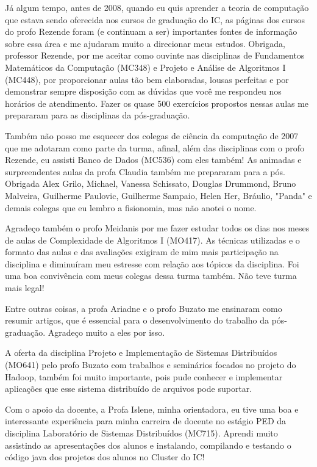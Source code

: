 Já algum tempo, antes de 2008, quando eu quis aprender a teoria de computação que estava sendo oferecida nos cursos de graduação do IC, as páginas dos cursos do profo Rezende foram (e continuam a ser) importantes fontes de informação sobre essa área e me ajudaram muito a direcionar meus estudos. Obrigada, professor Rezende, por me aceitar como ouvinte nas disciplinas de Fundamentos Matemáticos da Computação (MC348) e Projeto e Análise de Algoritmos I (MC448), por proporcionar aulas tão bem elaboradas, lousas perfeitas e por demonstrar sempre disposição com as dúvidas que você me respondeu nos horários de atendimento. Fazer os quase 500 exercícios propostos nessas aulas me prepararam para as disciplinas da pós-graduação.

Também não posso me esquecer dos colegas de ciência da computação de 2007 que me adotaram como parte da turma, afinal, além das disciplinas com o profo Rezende, eu assisti Banco de Dados (MC536) com eles também! As animadas e surpreendentes aulas da profa Claudia também me prepararam para a pós. Obrigada Alex Grilo, Michael, Vanessa Schissato, Douglas Drummond, Bruno Malveira, Guilherme Paulovic, Guilherme Sampaio, Helen Her, Bráulio, "Panda" e demais colegas que eu lembro a fisionomia, mas não anotei o nome.

Agradeço também o profo Meidanis por me fazer estudar todos os dias nos meses de aulas de Complexidade de Algoritmos I (MO417). As técnicas utilizadas e o formato das aulas e das avaliações exigiram de mim mais participação na disciplina e diminuíram meu estresse com relação aos tópicos da disciplina. Foi uma boa convivência com meus colegas dessa turma também. Não teve turma mais legal!

Entre outras coisas, a profa Ariadne e o profo Buzato me ensinaram como resumir artigos, que é essencial para o desenvolvimento do trabalho da pós-graduação. Agradeço muito a eles por isso.

A oferta da disciplina Projeto e Implementação de Sistemas Distribuídos (MO641) pelo profo Buzato com trabalhos e seminários focados no projeto do Hadoop, também foi muito importante, pois pude conhecer e implementar aplicações que esse sistema distribuído de arquivos pode suportar.

Com o apoio da docente, a Profa Islene, minha orientadora, eu tive uma boa e interessante experiência para minha carreira de docente no estágio PED da disciplina Laboratório de Sistemas Distribuídos (MC715). Aprendi muito assistindo as apresentações dos alunos e instalando, compilando e testando o código java dos projetos dos alunos no Cluster do IC!

